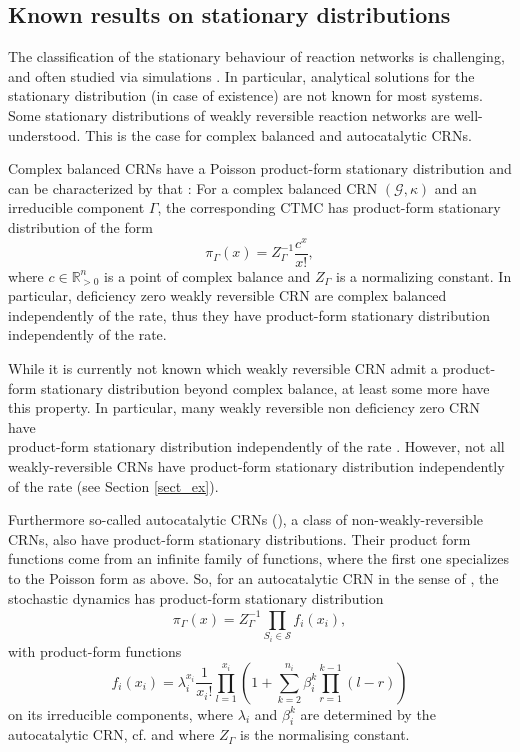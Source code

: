 \documentclass{amsart}
\theoremstyle{definition}
\theoremstyle{remark}
\theoremstyle{Conjecture/open problem}
\theoremstyle{assumption}
\theoremstyle{conjecture}
\def\be{\beta}
\def\Ga{\Gamma}
\def\k{\kappa}
\def\cG{\mathcal{G}}
\def\cS{\mathcal{S}}
\def\R{\mathbb{R}}
\numberwithin{equation}{section}
\begin{document}
\subsection{Known results on stationary distributions} \label{res_stat}
The classification of the stationary behaviour of reaction networks
is challenging, and often studied via simulations \cite{gillespieb}.
In particular, analytical solutions for the stationary distribution (in case of existence) are not known for most systems. Some stationary distributions of weakly reversible reaction networks are well-understood. This is the case for complex balanced and autocatalytic CRNs.

Complex balanced CRNs \cite{anderson2} have a Poisson product-form stationary distribution \cite{anderson2} and can be characterized by that \cite{Cappelletti}: For a complex balanced CRN $(\cG,\k)$ and an irreducible component $\Ga$, the corresponding CTMC has product-form stationary distribution of the form
 $$\pi_\Ga(x)=Z_\Ga^{-1} \frac{c^x}{x!},$$
 where $c\in\R^n_{>0}$ is a point of complex balance and $Z_\Ga$ is a normalizing constant. In particular, deficiency zero weakly reversible CRN are complex balanced independently of the rate, thus they have product-form stationary distribution independently of the rate. 

While it is currently not known which weakly reversible CRN admit a product-form stationary distribution beyond complex balance, at least some more have this property. In particular, many weakly reversible non deficiency zero CRN have \\
product-form stationary distribution independently of the rate \cite{hoesslyuni}. However, not all weakly-reversible CRNs have product-form stationary distribution independently of the rate (see Section \ref{sect_ex}).


Furthermore so-called autocatalytic CRNs (\cite[Section 3]{hoesslysta}), a class of non-weakly-reversible CRNs, also have product-form stationary distributions. Their product form functions come from an infinite family of functions, where the first one specializes to the Poisson form as above.  So, for
an autocatalytic CRN in the sense of \cite[Section 3]{hoesslysta},
the stochastic dynamics
has product-form stationary distribution
\begin{equation}\label{MainFormula}
\pi_\Ga(x)=Z_\Ga^{-1}\prod_{S_i\in\cS}^{ }f_i(x_i) ,
\end{equation}
with product-form functions
$$f_i(x_i)=\lambda_i^{x_i}\frac{1}{x_i!}\prod_{l=1}^{x_i}(1+\sum_{k=2}^{n_i}\be_i^k \prod_{r=1}^{k-1}(l-r))$$ 
on its irreducible components, where $\lambda_i$ and $\be_i^k$ are determined by the autocatalytic CRN, cf. \cite[Section 3]{hoesslysta} and where $Z_\Ga$ is the normalising constant. 
\end{document}
